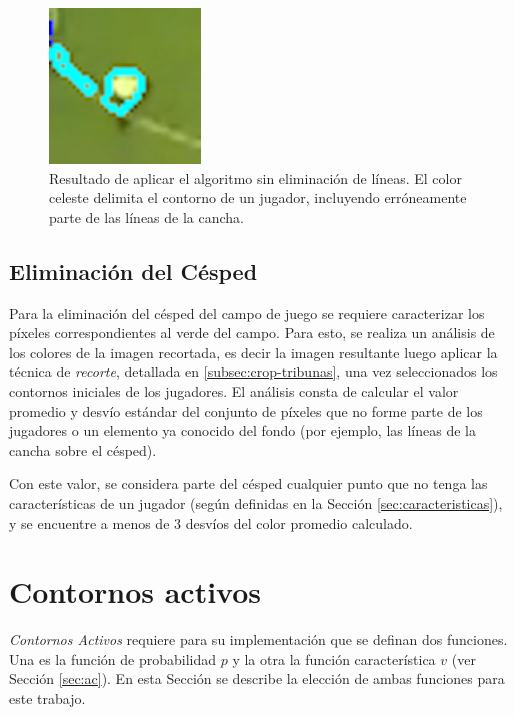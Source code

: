 \begin{figure}[H]
  \centering
  \includegraphics[width=0.3\linewidth]{./images/confusion-linea.png}
  \caption{ Resultado de aplicar el algoritmo sin eliminación de líneas.
    El color celeste delimita el contorno de un jugador, incluyendo erróneamente
    parte de las líneas de la cancha.}
      \label{fig:confusion-linea}
\end{figure}

\subsection{Eliminación del Césped}
\label{sec:cesped}

Para la eliminación del césped del campo de juego se requiere caracterizar los
píxeles correspondientes al verde del campo. Para esto, se realiza un análisis
de los colores de la imagen recortada, es decir la imagen resultante luego
aplicar la técnica de \textit{recorte}, detallada en
\ref{subsec:crop-tribunas}, una vez seleccionados los contornos iniciales de
los jugadores. El análisis consta de calcular el valor promedio y desvío
estándar del conjunto de píxeles que no forme parte de los jugadores o un
elemento ya conocido del fondo (por ejemplo, las líneas de la cancha sobre el
césped).

Con este valor, se considera parte del césped cualquier punto que no tenga las
características de un jugador (según definidas en la Sección
\ref{sec:caracteristicas}), y se encuentre a menos de $3$ desvíos del color
promedio calculado.

\section{Contornos activos} \label{sec:ac-extension}

\textit{Contornos Activos} requiere para su implementación que se definan dos
funciones. Una es la función de probabilidad $p$ y la otra la función
característica $v$ (ver Sección \ref{sec:ac}). En esta Sección se describe la
elección de ambas funciones para este trabajo.

